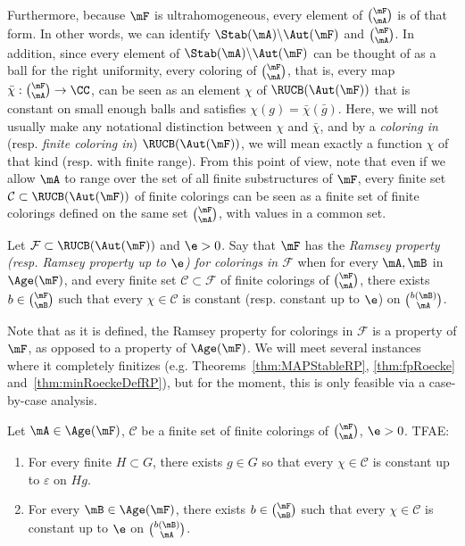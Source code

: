 Furthermore, because $\mF$ is ultrahomogeneous, every element of $\binom{\mF}{\mA}$ is of that form. In other words, we can identify $\Stab(\mA)\backslash \Aut(\mF)$ and $\binom{\mF}{\mA}$. In addition, since every element of $\Stab(\mA)\backslash \Aut(\mF)$ can be thought of as a ball for the right uniformity, every coloring of $\binom{\mF}{\mA}$, that is, every map $\bar\chi:\binom{\mF}{\mA}\rightarrow \CC$, can be seen as an element $\chi$ of $\RUCB(\Aut(\mF))$ that is constant on small enough balls and satisfies $\chi(g)=\bar\chi(\bar g)$. Here, we will not usually make any notational distinction between $\chi$ and $\bar\chi$, and by a \emph{coloring in} (resp. \emph{finite coloring in}) $\RUCB(\Aut(\mF))$, we will mean exactly a function $\chi$ of that kind (resp. with finite range). From this point of view, note that even if we allow $\mA$ to range over the set of all finite substructures of $\mF$, every finite set $\mathcal C \subset \RUCB(\Aut(\mF))$ of finite colorings can be seen as a finite set of finite colorings defined on the same set $\binom{\mF}{\mA}$, with values in a common set.

\begin{defi}
Let $\mathcal F \subset \RUCB(\Aut(\mF))$ and $\e>0$. Say that $\mF$ has the \emph{Ramsey property (resp. Ramsey property up to $\e$) for colorings in $\mathcal F$} when for every $\mA, \mB$ in $\Age(\mF)$, and every finite set $\mathcal C \subset \mathcal F$ of finite colorings of $\binom{\mF}{\mA}$, there exists $b\in \binom{\mF}{\mB}$ such that every $\chi\in \mathcal C$ is constant (resp. constant up to $\e$) on $\binom{b(\mB)}{\mA}$.
\end{defi}

Note that as it is defined, the Ramsey property for colorings in $\mathcal F$ is a property of $\mF$, as opposed to a property of $\Age(\mF)$. We will meet several instances where it completely finitizes (e.g. Theorems~\ref{thm:MAPStableRP}, \ref{thm:fpRoecke} and~\ref{thm:minRoeckeDefRP}), but for the moment, this is only feasible via a case-by-case analysis.



\begin{prop}\label{prop:aOSRamsey}
Let $\mA \in \Age(\mF)$, $\mathcal C$ be a finite set of finite colorings of $\binom{\mF}{\mA}$, $\e>0$. TFAE:
\begin{enumerate}
\item For every finite $H\subset G$, there exists $g\in G$ so that every $\chi \in \mathcal C$ is constant up to $\varepsilon$ on $Hg$.

\item For every $\mB \in \Age(\mF)$, there exists $b\in \binom{\mF}{\mB}$ such that every $\chi\in \mathcal C$ is constant up to $\e$ on $\binom{b(\mB)}{\mA}$.
\end{enumerate}
\end{prop}

